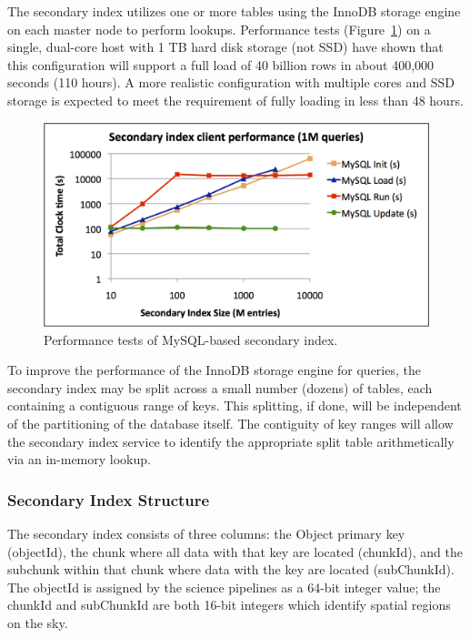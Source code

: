 \documentclass[DM,lsstdraft,toc]{lsstdoc}
\begin{document}
The secondary index utilizes one or more tables using the InnoDB storage
engine on each master node to perform lookups. Performance tests
(Figure~\ref{fig:indexing-tests}) on a single, dual-core host with 1 TB hard
disk storage (not SSD) have shown that this configuration will support a full
load of 40 billion rows in about 400,000 seconds (110 hours). A more realistic
configuration with multiple cores and SSD storage is expected to meet the
requirement of fully loading in less than 48 hours.

\begin{figure}[H]
\centering
\includegraphics[width=\textwidth]{_static/indexing_tests.png}
\caption{Performance tests of MySQL-based secondary index. \label{fig:indexing-tests}}
\end{figure}

To improve the performance of the InnoDB storage engine for queries, the
secondary index may be split across a small number (dozens) of tables, each
containing a contiguous range of keys. This splitting, if done, will be
independent of the partitioning of the database itself. The contiguity of key
ranges will allow the secondary index service to identify the appropriate
split table arithmetically via an in-memory lookup.

\subsubsection{Secondary Index Structure}\label{secondary-index-structure}

The secondary index consists of three columns: the Object primary key
(objectId), the chunk where all data with that key are located (chunkId), and
the subchunk within that chunk where data with the key are located
(subChunkId). The objectId is assigned by the science pipelines as a 64-bit
integer value; the chunkId and subChunkId are both 16-bit integers which
identify spatial regions on the sky.
\end{document}
